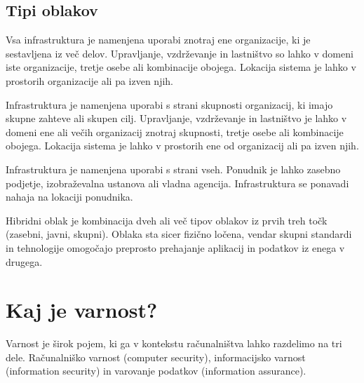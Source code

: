 \documentclass[12pt,a4paper,openany,tikz]{book}
\theoremstyle{plain}
\theoremstyle{definition}
\begin{document}
\subsection{Tipi oblakov}
\label{sub:Tipi oblakov}
\begin{description}[style=nextline]
	\item[Zasebni oblak] Vsa infrastruktura je namenjena uporabi znotraj ene organizacije, ki je sestavljena iz več delov. Upravljanje, vzdrževanje in lastništvo so lahko v domeni iste organizacije, tretje osebe ali kombinacije obojega. Lokacija sistema je lahko v prostorih organizacije ali pa izven njih.

	\item[Skupni oblak] Infrastruktura je namenjena uporabi s strani skupnosti organizacij, ki imajo skupne zahteve ali skupen cilj. Upravljanje, vzdrževanje in lastništvo je lahko v domeni ene ali večih organizacij znotraj skupnosti, tretje osebe ali kombinacije obojega. Lokacija sistema je lahko v prostorih ene od organizacij ali pa izven njih.

	\item[Javni oblak] Infrastruktura je namenjena uporabi s strani vseh. Ponudnik je lahko zasebno podjetje, izobraževalna ustanova ali vladna agencija. Infrastruktura se ponavadi nahaja na lokaciji ponudnika.

  \item[Hibridni oblak] Hibridni oblak je kombinacija dveh ali več tipov oblakov iz prvih treh točk (zasebni, javni, skupni). Oblaka sta sicer fizično ločena, vendar skupni standardi in tehnologije omogočajo preprosto prehajanje aplikacij in podatkov iz enega v drugega.
\end{description}

\section{Kaj je varnost?}
\label{sec:Kaj je varnost?}


Varnost je širok pojem, ki ga v kontekstu računalništva lahko razdelimo na tri dele. Računalniško varnost (computer security), informacijsko varnost (information security) in varovanje podatkov (information assurance).
\end{document}

